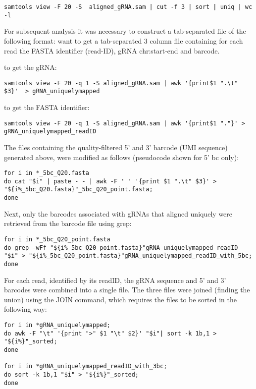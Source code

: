 \begin{footnotesize}
\begin{lstlisting}
samtools view -F 20 -S  aligned_gRNA.sam | cut -f 3 | sort | uniq | wc -l
\end{lstlisting}

For subsequent analysis it was necessary to construct a tab-separated file of the following format:
want to get a tab-separated 3 column file containing for each read the  FASTA identifier (read-ID), gRNA chr:start-end and barcode.

to get the gRNA:
\begin{lstlisting}
samtools view -F 20 -q 1 -S aligned_gRNA.sam | awk '{print$1 ".\t" $3}'  > gRNA_uniquelymapped
\end{lstlisting}

to get the FASTA identifier:
\begin{lstlisting}
samtools view -F 20 -q 1 -S aligned_gRNA.sam | awk '{print$1 "."}' > gRNA_uniquelymapped_readID
\end{lstlisting}

The files containing the quality-filtered 5' and 3' barcode (UMI sequence) generated above, were modified as follows (pseudocode shown for 5' bc only):

\begin{lstlisting}
for i in *_5bc_Q20.fasta
do cat "$i" | paste - - | awk -F ' ' '{print $1 ".\t" $3}' > "${i%_5bc_Q20.fasta}"_5bc_Q20_point.fasta;
done
\end{lstlisting}

Next, only the barcodes associated with gRNAs that aligned uniquely were retrieved from the barcode file using grep:

\begin{lstlisting}
for i in *_5bc_Q20_point.fasta
do grep -wFf "${i%_5bc_Q20_point.fasta}"gRNA_uniquelymapped_readID "$i" > "${i%_5bc_Q20_point.fasta}"gRNA_uniquelymapped_readID_with_5bc;
done
\end{lstlisting}

For each read, identified by its readID, the gRNA sequence and 5' and 3' barcodes were combined into a single file. The three files were joined (finding the union) using the JOIN command, which requires the files to be sorted in the following way:

\begin{lstlisting}
for i in *gRNA_uniquelymapped;
do awk -F "\t" '{print ">" $1 "\t" $2}' "$i"| sort -k 1b,1 > "${i%}"_sorted;
done

for i in *gRNA_uniquelymapped_readID_with_3bc;
do sort -k 1b,1 "$i" > "${i%}"_sorted;
done


\end{lstlisting}
\end{footnotesize}
